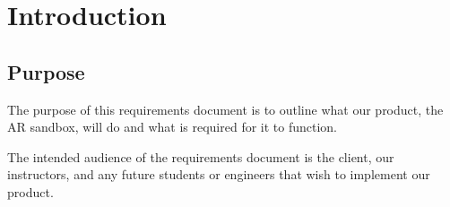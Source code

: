 \documentclass[onecolumn, draftclsnofoot,10pt, compsoc]{IEEEtran}
\begin{document}






\section{Introduction}
\subsection{Purpose}
The purpose of this requirements document is to outline what our product, the AR sandbox, will do and what is required for it to function.
\par The intended audience of the requirements document is the client, our instructors, and any future students or engineers that wish to implement our product.
\end{document}

